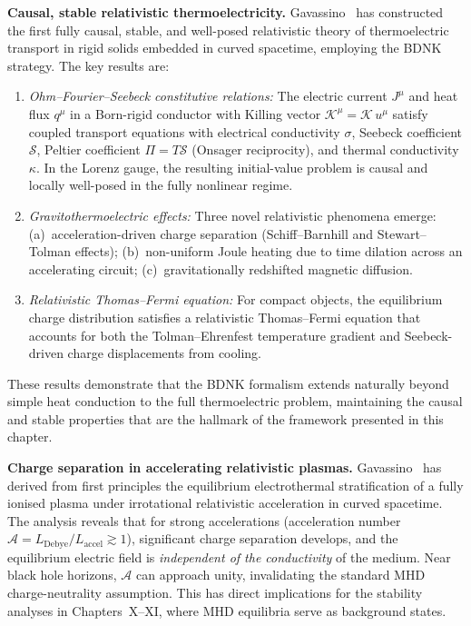 \begin{relcorrection}
\textbf{Causal, stable relativistic thermoelectricity.}
Gavassino~\cite{GavassinoThermoelectric2025} has constructed the first
fully causal, stable, and well-posed relativistic theory of
thermoelectric transport in rigid solids embedded in curved
spacetime, employing the BDNK strategy.  The key results are:
\begin{enumerate}
  \item \emph{Ohm--Fourier--Seebeck constitutive relations:}
    The electric current $J^\mu$ and heat flux $q^\mu$ in a Born-rigid
    conductor with Killing vector $\mathcal{K}^\mu = \mathcal{K}\,u^\mu$
    satisfy coupled transport equations with electrical conductivity
    $\sigma$, Seebeck coefficient $\mathcal{S}$, Peltier coefficient
    $\Pi = T\mathcal{S}$ (Onsager reciprocity), and thermal conductivity
    $\kappa$.  In the Lorenz gauge, the resulting initial-value problem
    is causal and locally well-posed in the fully nonlinear regime.

  \item \emph{Gravitothermoelectric effects:}
    Three novel relativistic phenomena emerge:
    (a)~acceleration-driven charge separation (Schiff--Barnhill and
    Stewart--Tolman effects);
    (b)~non-uniform Joule heating due to time dilation across an
    accelerating circuit;
    (c)~gravitationally redshifted magnetic diffusion.

  \item \emph{Relativistic Thomas--Fermi equation:}
    For compact objects, the equilibrium charge distribution satisfies a
    relativistic Thomas--Fermi equation that accounts for both the
    Tolman--Ehrenfest temperature gradient and Seebeck-driven charge
    displacements from cooling.
\end{enumerate}
These results demonstrate that the BDNK formalism extends naturally
beyond simple heat conduction to the full thermoelectric problem,
maintaining the causal and stable properties that are the hallmark
of the framework presented in this chapter.
\end{relcorrection}

\begin{relcorrection}
\textbf{Charge separation in accelerating relativistic plasmas.}
Gavassino~\cite{GavassinoChargeSeparation2025} has derived from first
principles the equilibrium electrothermal stratification of a fully
ionised plasma under irrotational relativistic acceleration in curved
spacetime.  The analysis reveals that for strong accelerations
(acceleration number
$\mathscr{A} = L_{\mathrm{Debye}}/L_{\mathrm{accel}} \gtrsim 1$),
significant charge separation develops, and the equilibrium electric
field is \emph{independent of the conductivity} of the medium.  Near
black hole horizons, $\mathscr{A}$ can approach unity, invalidating
the standard MHD charge-neutrality assumption.  This has direct
implications for the stability analyses in Chapters~X--XI, where MHD
equilibria serve as background states.
\end{relcorrection}

